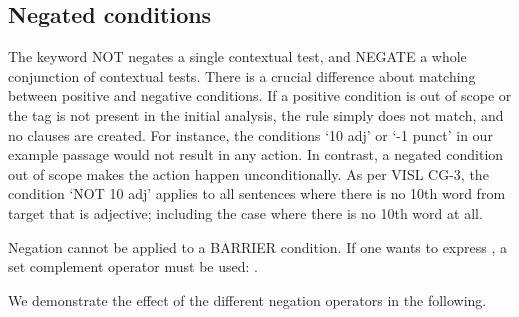 \subsection{Negated conditions}

The keyword NOT negates a single contextual test, and NEGATE a whole conjunction of contextual tests. 
There is a crucial difference about matching between positive and negative conditions.
If a positive condition is out of scope or the tag is not present in the initial analysis, the rule simply does not match, and no clauses are created. For instance, the conditions `10 adj' or `-1 punct' in our example passage would not result in any action.
In contrast, a negated condition out of scope makes the action happen unconditionally.
As per VISL CG-3, the condition `NOT 10 adj' applies to all sentences where there is no 10th word from target that is adjective; including the case where there is no 10th word at all.

Negation cannot be applied to a BARRIER condition. If one wants to express , a set complement operator must be used: .

We demonstrate the effect of the different negation operators in the following.

